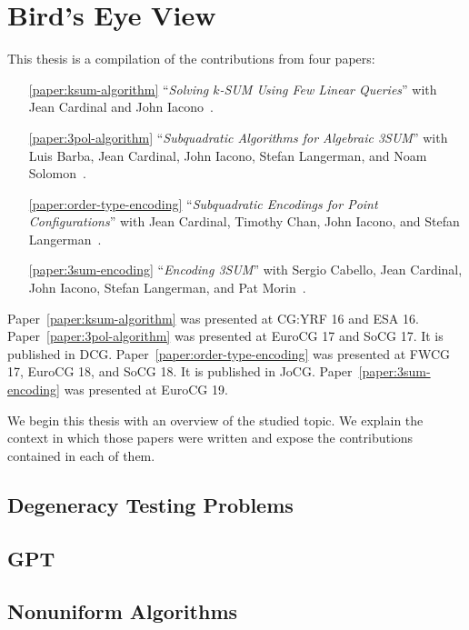 \chapter{\done Bird's Eye View}



This thesis is a compilation of the contributions from four papers:
%
\begin{enumerate}
	\item[\ref{paper:ksum-algorithm}] ``\emph{Solving \(k\)-SUM Using Few
		Linear Queries}''
		with Jean Cardinal and John Iacono~\cite{CIO16}.
	\item[\ref{paper:3pol-algorithm}] ``\emph{Subquadratic Algorithms for
		Algebraic 3SUM}''
		with Luis Barba, Jean Cardinal, John Iacono, Stefan Langerman, and Noam Solomon~\cite{BCILOS19}.
	\item[\ref{paper:order-type-encoding}] ``\emph{Subquadratic Encodings for
		Point Configurations}''
		with Jean Cardinal, Timothy Chan, John Iacono, and Stefan Langerman~\cite{CCILO19}.
	\item[\ref{paper:3sum-encoding}] ``\emph{Encoding 3SUM}''
		with Sergio Cabello, Jean Cardinal, John Iacono, Stefan Langerman,
		and Pat Morin~\cite{CCILMO19}.
\end{enumerate}
%
Paper~\ref{paper:ksum-algorithm} was presented at CG:YRF 16 and ESA 16.
%
Paper~\ref{paper:3pol-algorithm} was presented at EuroCG 17 and SoCG 17. It is published in DCG.
%
Paper~\ref{paper:order-type-encoding} was presented at FWCG 17, EuroCG 18, and SoCG 18. It is published in JoCG.
%
Paper~\ref{paper:3sum-encoding} was presented at EuroCG 19.

We begin this thesis with an overview of the studied topic.
%
We explain the context in which those papers were written and expose
the contributions contained in each of them.

\section*{Degeneracy Testing Problems}


\section*{GPT}


\section*{Nonuniform Algorithms}


